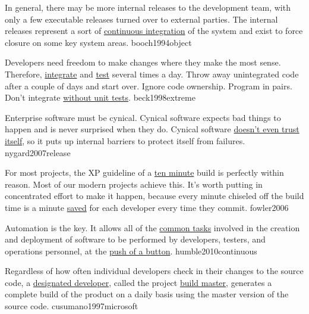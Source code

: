 \documentclass{article}
\begin{document}


  {In general, there may be more internal releases to the development team, with only a few executable releases turned over to external parties. The internal releases represent a sort of \ul{continuous integration} of the system and exist to force closure on some key system areas.}
  {booch1994object}

  {Developers need freedom to make changes where they make the most sense. Therefore, \ul{integrate} and \ul{test} several times a day. Throw away unintegrated code after a couple of days and start over. Ignore code ownership. Program in pairs. Don't integrate \ul{without unit tests}.}
  {beck1998extreme}

  {Enterprise software must be cynical. Cynical software expects bad things to happen and is never surprised when they do. Cynical software \ul{doesn't even trust itself}, so it puts up internal barriers to protect itself from failures.}
  {nygard2007release}


  {For most projects, the XP guideline of a \ul{ten minute} build is perfectly within reason. Most of our modern projects achieve this. It's worth putting in concentrated effort to make it happen, because every minute chiseled off the build time is a minute \ul{saved} for each developer every time they commit.}
  {fowler2006}

  {Automation is the key. It allows all of the \ul{common tasks} involved in the creation and deployment of software to be performed by developers, testers, and operations personnel, at the \ul{push of a button}.}
  {humble2010continuous}


  {Regardless of how often individual developers check in their changes to the source code, a \ul{designated developer}, called the project \ul{build master}, generates a complete build of the product on a daily basis using the master version of the source code.}
  {cusumano1997microsoft}
\end{document}
